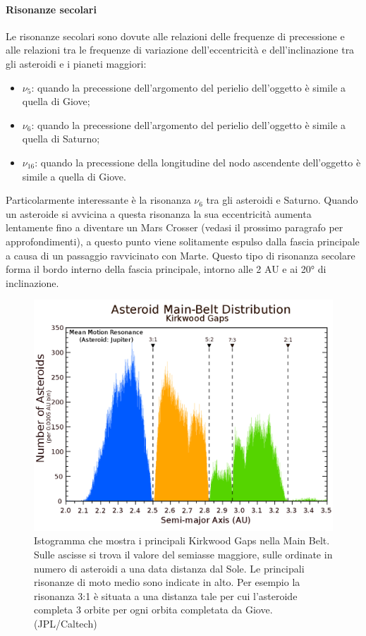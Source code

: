 \documentclass[a4paper,11pt,openright]{book}
\begin{document}
\paragraph*{Risonanze secolari}
Le risonanze secolari sono dovute alle relazioni delle frequenze di precessione e alle relazioni tra le frequenze di variazione dell'eccentricità e dell'inclinazione tra gli asteroidi e i pianeti maggiori:
\begin{itemize}
    \item $\nu_5$: quando la precessione dell'argomento del perielio dell'oggetto è simile a quella di Giove;
    \item $\nu_6$: quando la precessione dell'argomento del perielio dell'oggetto è simile a quella di Saturno;
    \item $\nu_{16}$: quando la precessione della longitudine del nodo ascendente dell'oggetto è simile a quella di Giove.
\end{itemize} 
Particolarmente interessante è la risonanza $\nu_6$ tra gli asteroidi e Saturno. Quando un asteroide si avvicina a questa risonanza la sua eccentricità aumenta lentamente fino a diventare un Mars Crosser (vedasi il prossimo paragrafo per approfondimenti), a questo punto viene solitamente espulso dalla fascia principale a causa di un passaggio ravvicinato con Marte. Questo tipo di risonanza secolare forma il bordo interno della fascia principale, intorno alle 2 AU e ai 20° di inclinazione.

\begin{figure}
    \centering
    \includegraphics[scale=0.24]{figure/jupiter_resonances.png}
    \caption[Risonanze di moto medio con Giove.]{Istogramma che mostra i principali Kirkwood Gaps nella Main Belt. Sulle ascisse si trova il valore del semiasse maggiore, sulle ordinate in numero di asteroidi a una data distanza dal Sole. Le principali risonanze di moto medio sono indicate in alto. Per esempio la risonanza 3:1 è situata a una distanza tale per cui l'asteroide completa 3 orbite per ogni orbita completata da Giove. (JPL/Caltech)}
    \label{fig:jupiter_resonances}
\end{figure}
\end{document}
